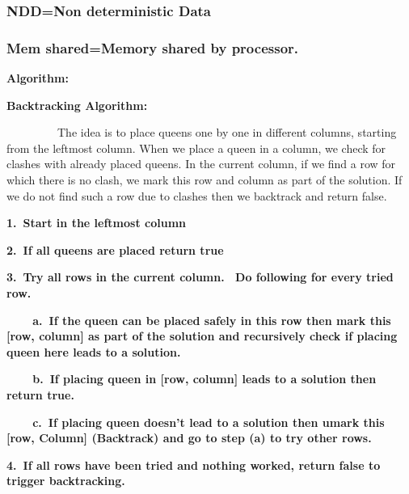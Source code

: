 \documentclass[a4paper,12pt]{article}
\begin{document}
\subsubsection[NDD=Non deterministic Data]{\rmfamily NDD=Non deterministic Data}
\subsubsection[Mem shared=Memory shared by processor.]{\rmfamily Mem shared=Memory shared by processor.}

\bigskip


\bigskip

{\bfseries
Algorithm:\ }


\bigskip

{\ttfamily
\textrm{\textbf{Backtracking Algorithm:\ }}}


\ \ \ \ \ \ \ \ \ The idea is to place queens one by one in different columns, starting from the leftmost column. When
we place a queen in a column, we check for clashes with already placed queens. In the current column, if we find a row
for which there is no clash, we mark this row and column as part of the solution. If we do not find such a row due to
clashes then we backtrack and return false.


\bigskip

{\bfseries
1.\ Start in the leftmost column}

{\bfseries
2.\ If all queens are placed return true}

{\bfseries
3.\ Try all rows in the current column. \ Do following for every tried row.}

{\bfseries
\ \ \ \ a.\ If the queen can be placed safely in this row then mark this [row, column] as part of the solution and
recursively check if placing queen here leads to a solution.}

{\bfseries
\ \ \ \ b.\ If placing queen in [row, column] leads to a solution then return true.}

{\bfseries
\ \ \ \ c.\ If placing queen doesn't lead to a solution then umark this [row, Column] (Backtrack) and go to step (a) to
try other rows.}

{\bfseries
4.\ If all rows have been tried and nothing worked, return false to trigger backtracking.}


\bigskip



\bigskip


\bigskip
\end{document}
